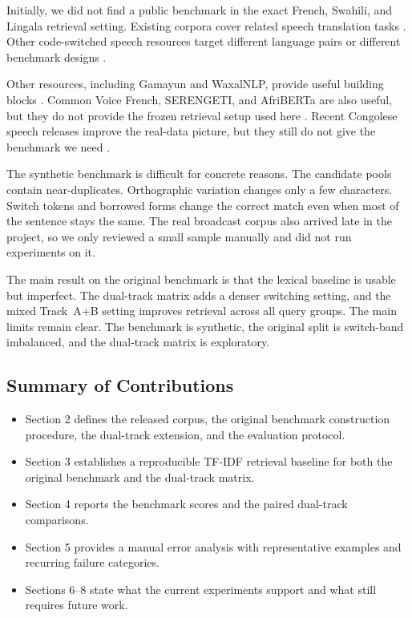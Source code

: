 \documentclass[11pt,twocolumn]{article}
\begin{document}
Initially, we did not find a public benchmark in the exact French, Swahili, and Lingala retrieval setting. Existing corpora cover related speech translation tasks \cite{denisov2021ims}. Other code-switched speech resources target different language pairs or different benchmark designs \cite{yan2025csfleurs,xie2025switchlingua,sailaja2025switchlangai}.

Other resources, including Gamayun and WaxalNLP, provide useful building blocks \cite{gamayun-kit,gamayun-data,google-waxalnlp}. Common Voice French, SERENGETI, and AfriBERTa are also useful, but they do not provide the frozen retrieval setup used here \cite{common-voice-fr,serengeti,afriberta}. Recent Congolese speech releases improve the real-data picture, but they still do not give the benchmark we need \cite{kimanuka2024speech,kimanuka2023mendeley,ussen2024cdwav2vec}.

The synthetic benchmark is difficult for concrete reasons. The candidate pools contain near-duplicates. Orthographic variation changes only a few characters. Switch tokens and borrowed forms change the correct match even when most of the sentence stays the same. The real broadcast corpus also arrived late in the project, so we only reviewed a small sample manually and did not run experiments on it.

The main result on the original benchmark is that the lexical baseline is usable but imperfect. The dual-track matrix adds a denser switching setting, and the mixed Track~A+B setting improves retrieval across all query groups. The main limits remain clear. The benchmark is synthetic, the original split is switch-band imbalanced, and the dual-track matrix is exploratory.

\subsection{Summary of Contributions}
\begin{itemize}
\item Section 2 defines the released corpus, the original benchmark construction procedure, the dual-track extension, and the evaluation protocol.
\item Section 3 establishes a reproducible TF-IDF retrieval baseline for both the original benchmark and the dual-track matrix.
\item Section 4 reports the benchmark scores and the paired dual-track comparisons.
\item Section 5 provides a manual error analysis with representative examples and recurring failure categories.
\item Sections 6--8 state what the current experiments support and what still requires future work.
\end{itemize}
\end{document}
